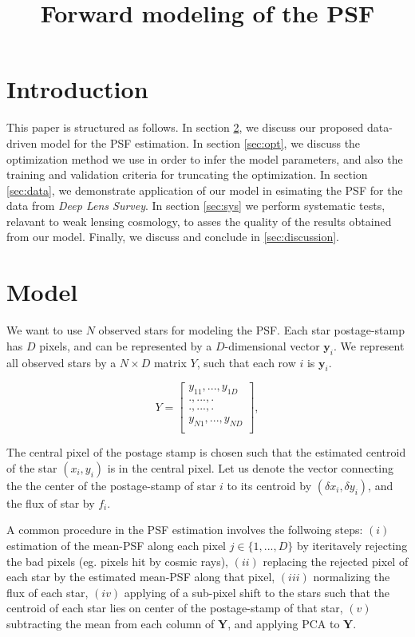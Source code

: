 \documentclass[12pt,preprint]{aastex}
\newcommand{\beq}{\begin{equation}}
\newcommand{\eeq}{\end{equation}}
\begin{document}
\title{Forward modeling of the PSF}
\section{Introduction}

This paper is structured as follows. In section \ref{sec:model},
we discuss our proposed data-driven model for the PSF estimation.
In section \ref{sec:opt}, we discuss the optimization method
 we use in order to infer the model parameters, and also
 the training and validation criteria for 
truncating the optimization. In section \ref{sec:data},
 we demonstrate application of our model in esimating
 the PSF for the data from \emph{Deep Lens Survey}. 
In section \ref{sec:sys} we perform systematic tests,
 relavant to weak lensing cosmology, 
to asses the quality of the results obtained from our model. 
Finally, we discuss and conclude in \ref{sec:discussion}.               

\section{Model}\label{sec:model}

We want to use $N$ observed stars for modeling the PSF. 
Each star postage-stamp has $D$ pixels, 
and can be represented by a $D$-dimensional vector 
$\mathbf{y}_{i}$. We represent all observed stars by a 
$N\times D$ matrix $Y$, such that each row $i$ 
is $\mathbf{y}_{i}$.

\beq
Y=
  \begin{bmatrix}
    y_{11}, ... , y_{1D} \\
    ., ... , . \\
    ., ... , . \\
    y_{N1}, ... , y_{ND} \\
  \end{bmatrix},
\eeq

The central pixel of 
the postage stamp is chosen such that the estimated centroid
of the star $(x_i , y_i)$ is in the central pixel. 
Let us denote the vector connecting the the center of the 
postage-stamp of star $i$ to its centroid by $(\delta x_{i},
\delta y_{i})$, and the flux of star by $f_{i}$. 
  
A common procedure in the PSF estimation involves the follwoing steps:
$(i)$ estimation of the mean-PSF along each pixel $j\in\{1,...,D\}$
by iteritavely rejecting the bad pixels (eg. pixels hit by cosmic rays),
 $(ii)$ replacing the rejected pixel of each star by the estimated mean-PSF 
along that pixel, $(iii)$ normalizing the flux of each star,
 $(iv)$ applying of a sub-pixel shift
to the stars such that the centroid of each star lies on center 
of the postage-stamp of that star, $(v)$ subtracting the mean from each
column of $\mathbf{Y}$, and applying PCA to $\mathbf{Y}$.
\end{document}

